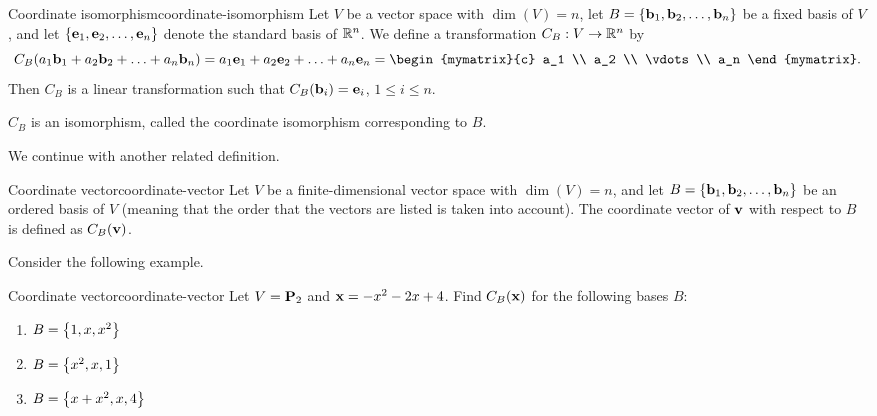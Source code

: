 \begin{definition}{Coordinate isomorphism}{coordinate-isomorphism}
  Let $V$ be a vector space with $\dim(V)=n$, let
  $B=\left\{\mbox{\bf b}_1, \mbox{\bf b}_2, \ldots, \mbox{\bf b}_n\right\}$ be a fixed
  basis of $V$, and let
  $\left\{\mbox{\bf e}_1, \mbox{\bf e}_2, \ldots, \mbox{\bf e}_n\right\}$ denote the
  standard basis of $\mathbb{R}^n$.  We define a transformation $C_B:V\to\mathbb{R}^n$
  by
  \begin{equation*}
    C_B(a_1\vect{b}_1 + a_2\vect{b}_2 + \ldots + a_n\vect{b}_n)
    =
    a_1\vect{e}_1 + a_2\vect{e}_2 + \ldots + a_n\vect{e}_n
    =
    \begin{mymatrix}{c} a_1 \\ a_2 \\ \vdots \\ a_n
    \end{mymatrix}.
  \end{equation*}
  Then $C_B$ is a linear transformation
  such that
  $C_B(\mbox{\bf b}_i)=\mbox{\bf e}_i$, $1\leq i\leq n$.

  $C_B$ is an isomorphism, called
  the coordinate isomorphism corresponding to $B$.
\end{definition}

We continue with another related definition.

\begin{definition}{Coordinate vector}{coordinate-vector}
  Let $V$ be a finite-dimensional vector space with $\dim(V)=n$, and
  let $B=\left\{\mbox{\bf b}_1, \mbox{\bf b}_2, \ldots, \mbox{\bf b}_n\right\}$ be an
  ordered basis of $V$ (meaning that the order that the vectors are
  listed is taken into account).  The coordinate vector of $\mbox{\bf v}$
  with respect to $B$ is defined as $C_B(\mbox{\bf v})$.
\end{definition}

Consider the following example.

\begin{example}{Coordinate vector}{coordinate-vector}
  Let $V = \mathbf{P}_2$ and $\mbox{\bf x} = -x^2 -2x + 4$.
  Find $C_B(\mbox{\bf x})$ for the following bases $B$:
  \begin{enumerate}
  \item $B = \left\{1, x, x^2 \right\}$
  \item $B = \left\{x^2, x, 1 \right\}$
  \item $B = \left\{x + x^2 , x , 4 \right\}$
  \end{enumerate}
\end{example}

